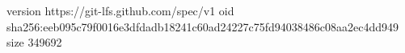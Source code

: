 version https://git-lfs.github.com/spec/v1
oid sha256:eeb095c79f0016e3dfdadb18241c60ad24227c75fd94038486c08aa2ec4dd949
size 349692
